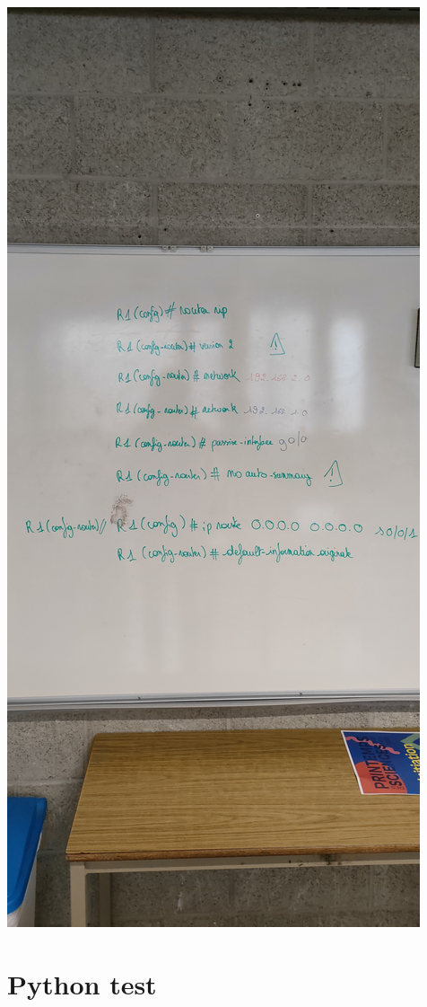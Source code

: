 \documentclass[a4paper, letterpaper]{report}
\begin{document}
\begin{center}
    \includegraphics[scale=0.1]{IMG20230328093527.jpg}
\end{center}

\section{Python test}
\label{ss:python}
\end{document}
